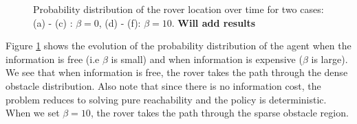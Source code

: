 \begin{figure}
	\begin{minipage}{5.0cm}
		\centering
	\end{minipage}
	\begin{minipage}{5.0cm}
		\centering
		
	\end{minipage}
	
	
	\caption{Probability distribution of the rover location over time for two cases: (a) - (c) : $\beta = 0$, (d) - (f): $\beta = 10$. \textbf{Will add results}
	}
	\label{fig:marsresults}
\end{figure}


Figure \ref{fig:marsresults} shows the evolution of the probability distribution of the agent when the information is free (i.e $\beta$ is small) and when information is expensive ($\beta$ is large). We see that when information is free, the rover takes the path through the dense obstacle distribution. Also note that since there is no information cost, the problem reduces to solving pure reachability and the policy is deterministic. When we set $\beta = 10$, the rover takes the path through the sparse obstacle region.
